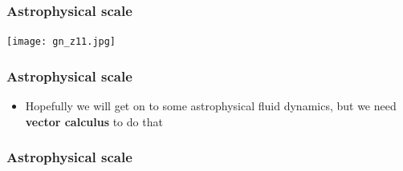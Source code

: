 \documentclass{beamer}
\begin{document}
\begin{frame}
  \frametitle{Astrophysical scale}
  \center
  \texttt{[image: gn\_z11.jpg]}
\end{frame}

\begin{frame}
  \frametitle{Astrophysical scale}
  \begin{itemize}
    \item Hopefully we will get on to some astrophysical fluid dynamics, but we need \textbf{vector calculus} to do that
  \end{itemize}
\end{frame}

\begin{frame}
  \frametitle{Astrophysical scale}
  \begin{itemize}
  \end{itemize}
\end{frame}
\end{document}
